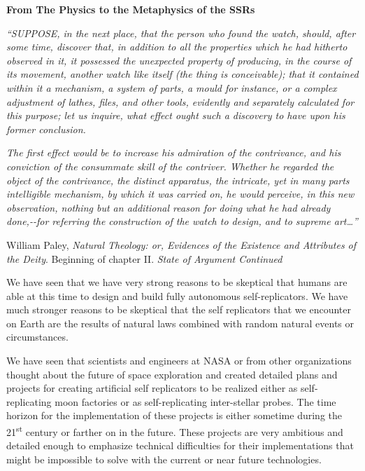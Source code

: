 \bigskip

{\bfseries
\hypertarget{RefHeading3166306210128}{}From The Physics to the
Metaphysics of the SSRs}

\textit{“SUPPOSE, in the next place, that the person who found the
watch, should, after some time, discover that, in addition to all the
properties which he had hitherto observed in it, it possessed the
unexpected property of producing, in the course of its movement,
another watch like itself (the thing is conceivable); that it contained
within it a mechanism, a system of parts, a mould for instance, or a
complex adjustment of lathes, files, and other tools, evidently and
separately calculated for this purpose; let us inquire, what effect
ought such a discovery to have upon his former conclusion.}

\textit{The first effect would be to increase his admiration of the
contrivance, and his conviction of the consummate skill of the
contriver. Whether he regarded the object of the contrivance, the
distinct apparatus, the intricate, yet in many parts intelligible
mechanism, by which it was carried on, he would perceive, in this new
observation, nothing but an additional reason for doing what he had
already done,-{}-for referring the construction of the watch to design,
and to supreme art…”}

William Paley, \textit{Natural Theology: or, Evidences of the Existence
and Attributes of the Deity}. Beginning of chapter II. \textit{State of
Argument Continued}


\bigskip


\bigskip

We have seen that we have very strong reasons to be skeptical that
humans are able at this time to design and build fully autonomous
self-replicators. We have much stronger reasons to be skeptical that
the self replicators that we encounter on Earth are the results of
natural laws combined with random natural events or circumstances.


\bigskip

We have seen that scientists and engineers at NASA or from other
organizations thought about the future of space exploration and created
detailed plans and projects for creating artificial self replicators to
be realized either as self-replicating moon factories or as
self-replicating inter-stellar probes.  The time horizon for the
implementation of these projects is either sometime during the
21\textsuperscript{st} century or farther on in the future. These
projects are very ambitious and detailed enough to emphasize technical
difficulties for their implementations that might be impossible to
solve with the current or near future technologies.


